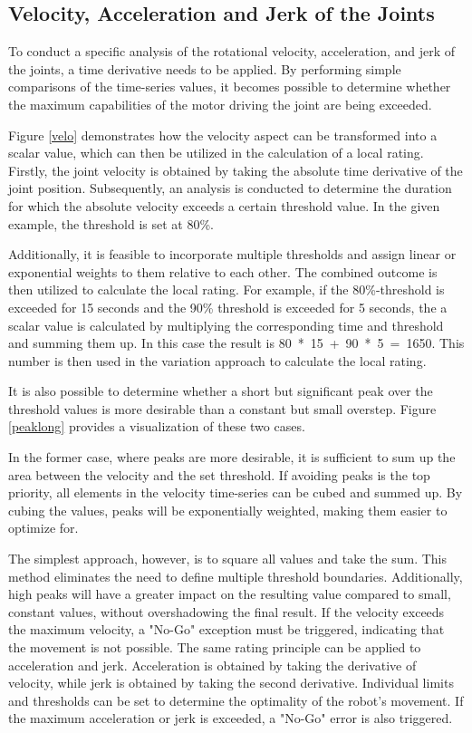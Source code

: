 \documentclass[conference]{IEEEtran}
\begin{document}
\subsection{Velocity, Acceleration and Jerk of the Joints}\label{VAJJ}
To conduct a specific analysis of the rotational velocity, acceleration, and jerk of the joints, a time derivative needs to be applied. By performing simple comparisons of the time-series values, it becomes possible to determine whether the maximum capabilities of the motor driving the joint are being exceeded.

Figure \ref{velo} demonstrates how the velocity aspect can be transformed into a scalar value, which can then be utilized in the calculation of a local rating. Firstly, the joint velocity is obtained by taking the absolute time derivative of the joint position. Subsequently, an analysis is conducted to determine the duration for which the absolute velocity exceeds a certain threshold value. In the given example, the threshold is set at 80\%. 


Additionally, it is feasible to incorporate multiple thresholds and assign linear or exponential weights to them relative to each other. The combined outcome is then utilized to calculate the local rating. For example, if the 80\%-threshold is exceeded for 15 seconds and the 90\% threshold is exceeded for 5 seconds, the a scalar value is calculated by multiplying the corresponding time and threshold and summing them up. In this case the result is 80~*~15~+~90~*~5~=~1650. This number is then used in the variation approach to calculate the local rating.

It is also possible to determine whether a short but significant peak over the threshold values is more desirable than a constant but small overstep. Figure \ref{peaklong} provides a visualization of these two cases.



In the former case, where peaks are more desirable, it is sufficient to sum up the area between the velocity and the set threshold. If avoiding peaks is the top priority, all elements in the velocity time-series can be cubed and summed up. By cubing the values, peaks will be exponentially weighted, making them easier to optimize for.


The simplest approach, however, is to square all values and take the sum. This method eliminates the need to define multiple threshold boundaries. Additionally, high peaks will have a greater impact on the resulting value compared to small, constant values, without overshadowing the final result. If the velocity exceeds the maximum velocity, a "No-Go" exception must be triggered, indicating that the movement is not possible. The same rating principle can be applied to acceleration and jerk. Acceleration is obtained by taking the derivative of velocity, while jerk is obtained by taking the second derivative. Individual limits and thresholds can be set to determine the optimality of the robot's movement. If the maximum acceleration or jerk is exceeded, a "No-Go" error is also triggered.
\end{document}
